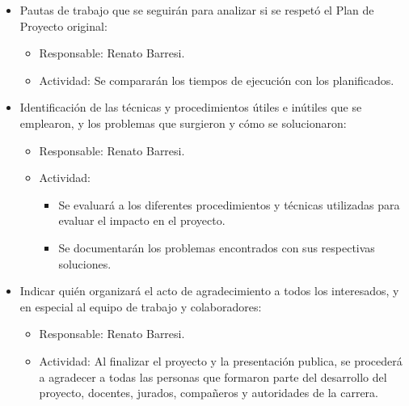 \documentclass[
11pt, %
]{charter}
\begin{document}
\begin{itemize}
	\item Pautas de trabajo que se seguirán para analizar si se respetó el Plan de Proyecto original:
		\begin{itemize}
	 		\item Responsable: Renato Barresi.
	 		\item Actividad: Se compararán los tiempos de ejecución con los planificados.\\
		\end{itemize}	  
	\item Identificación de las técnicas y procedimientos útiles e inútiles que se emplearon, y los problemas que surgieron y cómo se solucionaron:
		\begin{itemize}
	 		\item Responsable: Renato Barresi.
	 		\item Actividad:\\
	 			\begin{itemize}
	 				\item Se evaluará a los diferentes procedimientos y técnicas utilizadas para evaluar el impacto en el proyecto.
	 				\item Se documentarán los problemas encontrados con sus respectivas soluciones.
	 			\end{itemize}
		\end{itemize}	  
	\item Indicar quién organizará el acto de agradecimiento a todos los interesados, y en especial al equipo de trabajo y colaboradores:
		\begin{itemize}
	 		\item Responsable: Renato Barresi.
	 		\item Actividad: Al finalizar el proyecto y la presentación publica, se procederá a agradecer a todas las personas que formaron parte del desarrollo del proyecto, docentes, jurados, compañeros y autoridades de la carrera.\\
		\end{itemize}	  
\end{itemize}
\end{document}
